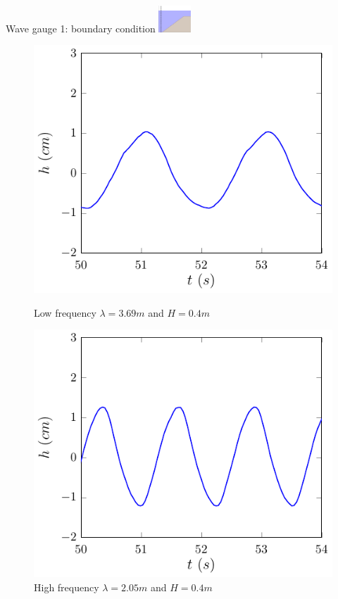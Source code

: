 \documentclass[pdf]{beamer}
\begin{document}
\begin{frame}{Wave gauge 1: boundary condition \space\space	\includegraphics[width=1.2cm]{./Pics/WT1z.pdf} }
    \begin{figure}
    	\centering
    	\begin{minipage}{.5\textwidth}
    		\centering
    		\includegraphics[width=0.9\linewidth]{./Pics/SLWG1.pdf}
    		\caption{Low frequency $\lambda = 3.69m$ and $H = 0.4m$}
    	\end{minipage}%
    	\begin{minipage}{.5\textwidth}
    		\centering
    		\includegraphics[width=0.9\linewidth]{./Pics/WG1.pdf}
    		\caption{High frequency $\lambda = 2.05m$ and $H = 0.4m$}
    	\end{minipage}
    \end{figure}
\end{frame}
\end{document}
